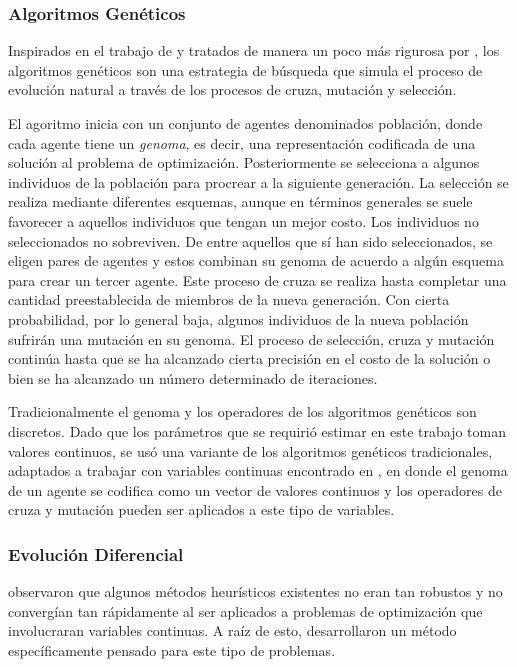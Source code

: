 \subsubsection{Algoritmos Genéticos}

Inspirados en el trabajo de \citeauthor{holland1975} \citep{holland1975} y tratados de manera un poco más rigurosa por \citeauthor{Goldberg1989} \citep{Goldberg1989}, los algoritmos genéticos son una estrategia de búsqueda que simula el proceso de evolución natural a través de los procesos de cruza, mutación y selección.

El agoritmo inicia con un conjunto de agentes denominados población, donde cada agente tiene un \emph{genoma}, es decir, una representación codificada de una solución al problema de optimización. Posteriormente se selecciona a algunos individuos de la población para procrear a la siguiente generación. La selección se realiza mediante diferentes esquemas, aunque en términos generales se suele favorecer a aquellos individuos que tengan un mejor costo. Los individuos no seleccionados no sobreviven. De entre aquellos que sí han sido seleccionados, se eligen pares de agentes y estos combinan su genoma de acuerdo a algún esquema para crear un tercer agente. Este proceso de cruza se realiza hasta completar una cantidad preestablecida de miembros de la nueva generación. Con cierta probabilidad, por lo general baja, algunos individuos de la nueva población sufrirán una mutación en su genoma. El proceso de selección, cruza y mutación continúa hasta que se ha alcanzado cierta precisión en el costo de la solución o bien se ha alcanzado un número determinado de iteraciones.

Tradicionalmente el genoma y los operadores de los algoritmos genéticos son discretos. Dado que los parámetros que se requirió estimar en este trabajo toman valores continuos, se usó una variante de los algoritmos genéticos tradicionales, adaptados a trabajar con variables continuas encontrado en \citeauthor{Haupt1998} \citep{Haupt1998}, en donde el genoma de un agente se codifica como un vector de valores continuos y los operadores de cruza y mutación pueden ser aplicados a este tipo de variables.

\subsubsection{Evolución Diferencial}

\citeauthor{Storn1997} \citep{Storn1997} observaron que algunos métodos heurísticos existentes no eran tan robustos y no convergían tan rápidamente al ser aplicados a problemas de optimización que involucraran variables continuas. A raíz de esto, desarrollaron un método específicamente pensado para este tipo de problemas. 


